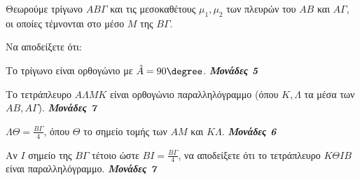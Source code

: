 \documentclass[11pt,a4paper,twoside]{book}
\newcommand{\monades}[1]{
\hspace*{\fill}
\textbf{\textit{\textcolor{maincolor}{Μονάδες #1}}}}
\begin{document}
Θεωρούμε τρίγωνο $ΑΒ\varGamma $ και τις μεσοκαθέτους $\mu_1, \mu_2$ των πλευρών του $ΑΒ$ και $Α\varGamma $, οι οποίες τέμνονται στο μέσο $M$ της $Β\varGamma $.

\begin{alist}
\item Να αποδείξετε ότι:
\begin{alist}
\item Το τρίγωνο είναι ορθογώνιο με $\hat{A} = 90\degree$. \monades{5}
\item Το τετράπλευρο $A\Lambda M K$ είναι ορθογώνιο παραλληλόγραμμο (όπου $K, \Lambda$ τα μέσα των $ΑΒ, Α\varGamma $). \monades{7}
\item $\Lambda\varTheta  = \frac{Β\varGamma }{4}$, όπου $\varTheta $ το σημείο τομής των $ΑΜ$ και $K\Lambda$. \monades{6}
\end{alist}
\item Αν $I$ σημείο της $Β\varGamma $ τέτοιο ώστε $ΒI = \frac{Β\varGamma }{4}$, να αποδείξετε ότι το τετράπλευρο $K\varTheta  IB$ είναι παραλληλόγραμμο. \monades{7}

\begin{center}
\end{center}
\end{alist}

\vspace{4mm}
\end{document}
